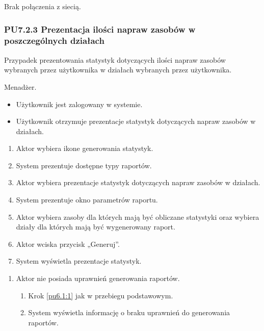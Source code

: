 Brak połączenia z siecią.

\subsubsection{PU7.2.3 Prezentacja ilości napraw zasobów w poszczególnych działach}
Przypadek prezentowania statystyk dotyczących ilości napraw zasobów wybranych przez użytkownika w działach wybranych przez użytkownika.

Menadżer.

\begin{itemize}
\item Użytkownik jest zalogowany w systemie.
\end{itemize}

\begin{itemize}
\item Użytkownik otrzymuje prezentacje statystyk dotyczących napraw zasobów w działach.
\end{itemize}

\begin{enumerate}
	\item \label{pu7.2.3:1} Aktor wybiera ikone generowania statystyk.
	\item System prezentuje dostępne typy raportów.
	\item \label{pu7.2.3:2} Aktor wybiera prezentacje statystyk dotyczących napraw zasobów w działach.
	\item System prezentuje okno parametrów raportu.
	\item Aktor wybiera zasoby dla których mają być obliczane statystyki oraz wybiera działy dla których mają być wygenerowany raport.
	\item Aktor wciska przycisk „Generuj”.
	\item System wyświetla prezentacje statystyk.
\end{enumerate}

\begin{enumerate}
	\item Aktor nie posiada uprawnień generowania raportów.
	\begin{enumerate}[label*=\arabic*.]
		\item Krok \ref{pu6.1:1} jak w przebiegu podstawowym.
		\item System wyświetla informację o braku uprawnień do generowania raportów.
	\end{enumerate}
\end{enumerate}

